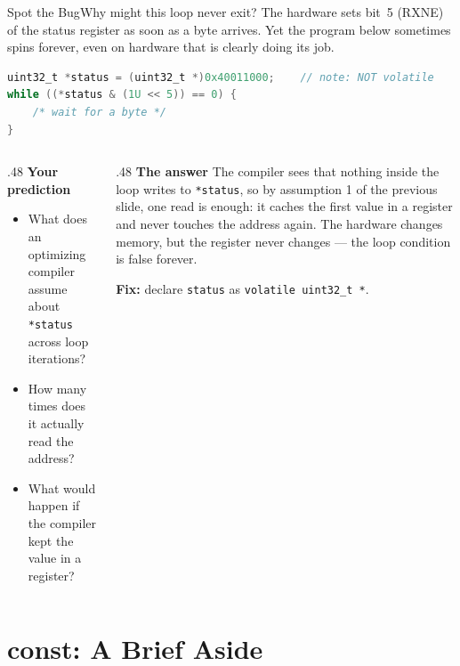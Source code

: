 \documentclass[9pt,aspectratio=169,xcolor=table]{beamer}
\begin{document}
{\beamerextras
\begin{frame}[fragile]{Spot the Bug}{Why might this loop never exit?}
    \leavevmode
    The hardware sets bit~5 (RXNE) of the status register as soon as a byte
    arrives. Yet the program below sometimes spins forever, even on
    hardware that is clearly doing its job.

    \vspace{3mm}
\begin{lstlisting}[language=C, basicstyle=\ttfamily\footnotesize]
uint32_t *status = (uint32_t *)0x40011000;    // note: NOT volatile
while ((*status & (1U << 5)) == 0) {
    /* wait for a byte */
}
\end{lstlisting}

    \vspace{3mm}
    \begin{columns}[T]
    \begin{column}{.48\textwidth}
        \textbf{Your prediction}
        {\small
        \begin{itemize}\itemsep1pt
            \item What does an optimizing compiler assume about \texttt{*status} across loop iterations?
            \item How many times does it actually read the address?
            \item What would happen if the compiler kept the value in a register?
        \end{itemize}}
    \end{column}
    \begin{column}{.48\textwidth}
        \textbf{The answer}
        {\small The compiler sees that nothing inside the loop writes to \texttt{*status}, so by assumption 1 of the previous slide, one read is enough: it \alert{caches the first value in a register} and never touches the address again. The hardware changes memory, but the register never changes --- the loop condition is false forever.}

        \vspace{1mm}
        {\small \textbf{Fix:} declare \texttt{status} as \texttt{volatile uint32\_t *}.}
    \end{column}
    \end{columns}
\end{frame}
}


\section{const: A Brief Aside}
\end{document}
